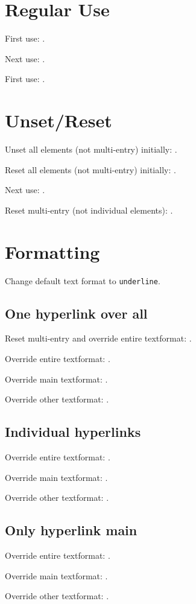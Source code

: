 \documentclass[12pt]{article}
\begin{document}
\section{Regular Use}
First use: .

Next use: .

First use: .

\section{Unset/Reset}

Unset all elements (not multi-entry) initially: .

Reset all elements (not multi-entry) initially: .

Next use: .

Reset multi-entry (not individual elements): .

\section{Formatting}
Change default text format to \texttt{underline}.

\subsection{One hyperlink over all}

Reset multi-entry and override entire textformat:
.

Override entire textformat: .

Override main textformat: .

Override other textformat: .

\subsection{Individual hyperlinks}

Override entire textformat: .

Override main textformat: .

Override other textformat: .

\subsection{Only hyperlink main}

Override entire textformat: .

Override main textformat: .

Override other textformat: .

\printglossaries
\end{document}
